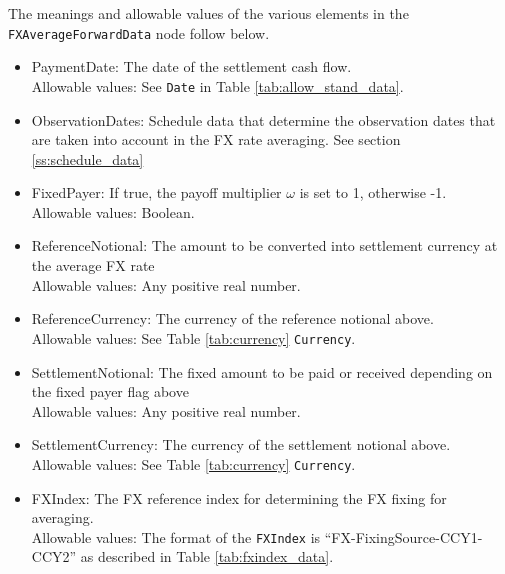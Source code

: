 The meanings and allowable values of the various elements in the \lstinline!FXAverageForwardData! node follow below.

\begin{itemize}
\item PaymentDate: The date of the settlement cash flow. \\ Allowable values:  See \lstinline!Date! in Table \ref{tab:allow_stand_data}.
\item ObservationDates: Schedule data that determine the observation dates that are taken into account in the FX rate averaging. See section \ref{ss:schedule_data}
\item FixedPayer: If true, the payoff multiplier $\omega$ is set to 1, otherwise -1.  \\ Allowable values:  Boolean.
\item ReferenceNotional: The amount to be converted into settlement currency at the average FX rate \\ Allowable values:  Any positive real number.
\item ReferenceCurrency: The currency of the reference notional above.  \\ Allowable values: See Table \ref{tab:currency}  \lstinline!Currency!.
\item SettlementNotional: The fixed amount to be paid or received depending on the fixed payer flag above \\ Allowable values:  Any positive real number.
\item SettlementCurrency: The currency of the settlement notional above. \\ Allowable values: See Table \ref{tab:currency}  \lstinline!Currency!.
\item FXIndex: The FX reference index for determining the FX fixing for averaging.  \\
Allowable values: The format of the \lstinline!FXIndex! is ``FX-FixingSource-CCY1-CCY2'' as described in Table \ref{tab:fxindex_data}.
\end{itemize}
